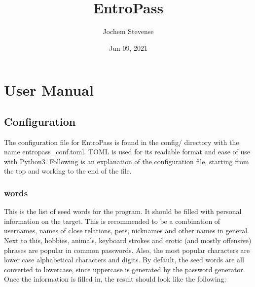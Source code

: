 \documentclass[letterpaper,10pt,english]{sphinxmanual}
\title{EntroPass}
\date{Jun 09, 2021}
\author{Jochem Stevense}
\begin{document}
\pagestyle{empty}
\sphinxmaketitle
\pagestyle{plain}
\sphinxtableofcontents
\pagestyle{normal}
\label{\detokenize{index::doc}}



\chapter{User Manual}
\label{\detokenize{usage:user-manual}}\label{\detokenize{usage::doc}}

\section{Configuration}
\label{\detokenize{usage:configuration}}
\sphinxAtStartPar
The configuration file for EntroPass is found in the config/ directory with the name entropass\_conf.toml. TOML is used for its readable format and ease of use with Python3. Following is an explanation of the configuration file, starting from the top and working to the end of the file.


\subsection{words}
\label{\detokenize{usage:words}}

\begin{fulllineitems}
\label{\detokenize{usage:list}}
\sphinxAtStartPar
This is the list of seed words for the program. It should be filled with personal information on the target. This is recommended to be a combination of usernames, names of close relations, pets, nicknames and other names in general. Next to this, hobbies, animals, keyboard strokes and erotic (and mostly offensive) phrases are popular in common passwords. Also, the most popular characters are lower case alphabetical characters and digits. By default, the seed words are all converted to lowercase, since uppercase is generated by the password generator. Once the information is filled in, the result should look like the following:

\begin{sphinxVerbatim}[commandchars=\\\{\}]
\PYG{p}{[}\PYG{p}{]}
  \PYG{p}{[}
 \PYG{p}{]}
\end{sphinxVerbatim}

\end{fulllineitems}
\end{document}
